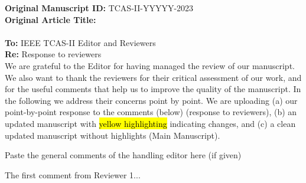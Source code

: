 \documentclass[./IEEE_Journal.tex]{subfiles}
\begin{document}
\onecolumn
\vspace{2mm}
\noindent \textbf{Original Manuscript ID:} TCAS-II-YYYYY-2023  \\  
\textbf{Original Article Title:}   \\
\vspace{2mm}
\\\textbf{To:} IEEE TCAS-II Editor and Reviewers \\
\textbf{Re:} Response to reviewers \\

We are grateful to the Editor for having managed the review of our manuscript. We also want to thank the reviewers for their critical assessment of our work, and for the useful comments that help us to improve the quality of the manuscript.
In the following we address their concerns point by point. 
We are uploading (a) our point-by-point response to the comments (below) (response to reviewers), (b) an updated manuscript with \hl{yellow highlighting} indicating changes, and (c) a clean updated manuscript without highlights (Main Manuscript).

\reviewersection 
    Paste the general comments of the handling editor here (if given) \\


\begin{point}
     The first comment from Reviewer 1... \\
\end{point}
\end{document}
